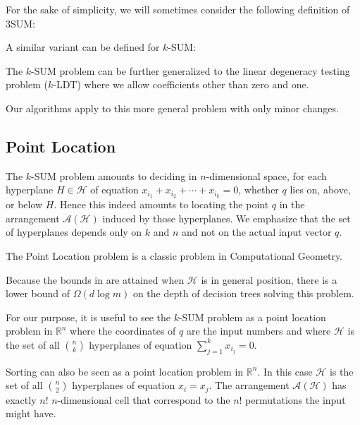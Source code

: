 For the sake of simplicity, we will sometimes consider the following definition of 3SUM\@:


A similar variant can be defined for \(k\)-SUM\@:


The \(k\)-SUM problem can be further generalized to the
linear degeneracy testing problem (\(k\)-LDT) where we allow
coefficients other than zero and one.
%

%
Our algorithms apply to this more general problem with only minor changes.




\subsection{Point Location}


The \(k\)-SUM problem amounts to deciding in $n$-dimensional space, for each hyperplane
\(H \in \mathcal{H}\) of equation \(x_{i_1} + x_{i_2} + \cdots +x_{i_k} = 0\), whether \(q\)
lies on, above, or below \(H\). Hence this indeed amounts to locating the point
$q$ in the arrangement \(\mathcal{A}(\mathcal{H})\) induced by those hyperplanes.
We emphasize that the set of hyperplanes depends only on $k$ and $n$ and not on
the actual input vector $q$.



The Point Location problem is a classic problem in Computational Geometry.

Because the bounds in  are attained when \(\mathcal{H}\) is in
general position, there is a lower bound of \(\Omega(d \log m)\) on the depth
of decision trees solving this problem.

For our purpose, it is useful to see the \(k\)-SUM problem as a point location
problem in \(\mathbb{R}^n\) where the coordinates of \(q\) are the input
numbers and where \(\mathcal{H}\) is the set of all \(n \choose k\) hyperplanes
of equation \(\sum_{j=1}^{k} x_{i_j} = 0\).

Sorting can also be seen as a point location problem in \(\mathbb{R}^n\).
In this case \(\mathcal{H}\) is the set of all \(n \choose 2\) hyperplanes of
equation \(x_i = x_j\). The arrangement \(\mathcal{A}(\mathcal{H})\) has
exactly \(n!\) \(n\)-dimensional cell that correspond to the \(n!\)
permutations the input might have.

